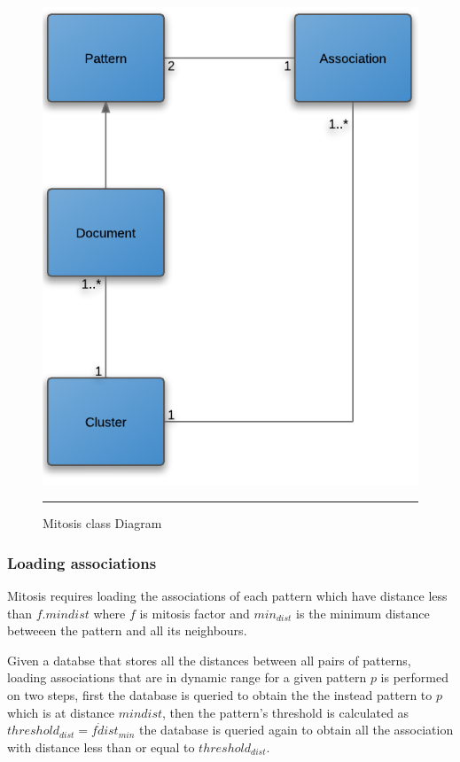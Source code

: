 \begin{figure}[htbp]
	\centering
		\includegraphics{./Figures/Mitosis_6.png}
		\rule{25em}{0.3pt}
	\caption[Mitosis class Diagram]{Mitosis class Diagram}
	\label{fig:mitosis_6}
\end{figure}

\subsubsection{Loading associations} 
Mitosis requires loading the associations of each pattern which have distance less than $f.min{dist}$ where $f$ is mitosis factor and $min_{dist}$ is the minimum distance betweeen the pattern and all its neighbours.

Given a databse that stores all the distances between all pairs of patterns, loading associations that are in dynamic range for a given pattern $p$ is performed on two steps, first the database is queried to obtain the the instead pattern to $p$ which is at distance $min{dist}$, then the pattern's threshold is calculated as $threshold_{dist} = f \dot dist_{min}$ the database is queried again to obtain all the association with distance less than or equal to $threshold_{dist}$.

